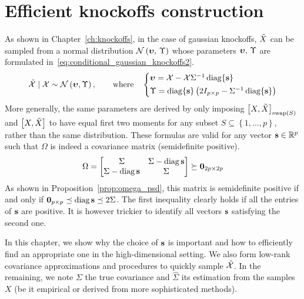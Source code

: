 \chapter{Efficient knockoffs construction}\label{ch:sdp}

As shown in Chapter~\ref{ch:knockoffs}, in the case of gaussian knockoffs,
$\tilde{X}$ can be sampled from a normal distribution $\mathcal{N}\left( \bm{\upsilon},\, \Upsilon \right)$ whose parameters
$\bm{\upsilon},\, \Upsilon$ are formulated in~\ref{eq:conditional_gaussian_knockoffs2}.
\begin{equation}\label{eq:conditional_gaussian_knockoffs2}
    \tcX \mid \cX \sim \cN\left( \bupsilon, \Upsilon \right)
    ,\qquad\text{where}\quad
    \begin{cases*}
        \bupsilon = \cX - \cX\Sigma^{-1}\diag\{ \bs \}\\
        \Upsilon = \diag\{ \bs \}\left( 2I_{p \times p} - \Sigma^{-1}\diag\{ \bs \} \right)
    \end{cases*}
\end{equation}
More generally, the same parameters are derived by only imposing
$\big[ X, \tilde{X} \big]_{\operatorname{swap}\left( S \right)}$ and $\big[ X, \tilde{X} \big]$
to have equal first two moments
for any subset
$S \subseteq \left\{ 1, \dots, p \right\}$,
rather than the same distribution.
These formulas are valid for any vector $\mathbf{s} \in \mathbb{R}^p$ such that $\Omega$
is indeed a covariance matrix (semidefinite positive).
\begin{equation*}
    \Omega = \begin{bmatrix}
        \Sigma & \Sigma - \operatorname*{diag} \mathbf{s}\\
        \Sigma - \operatorname*{diag} \mathbf{s} & \Sigma
    \end{bmatrix}
    \succeq \mathbf{0}_{2p \times 2p}
\end{equation*}
As shown in Proposition~\ref{prop:omega_psd},
this matrix is semidefinite positive if and only if $\mathbf{0}_{p \times p} \preceq \operatorname*{diag} \mathbf{s} \preceq 2 \Sigma$.
The first inequality clearly holds if all the entries of $\mathbf{s}$ are positive.
It is however trickier to identify all vectors $\mathbf{s}$ satisfying the second one.

In this chapter, we show why the choice of $\mathbf{s}$ is important and how to efficiently find an appropriate one
in the high-dimensional setting.
We also form low-rank covariance approximations and procedures to quickly sample $\tilde{\mathcal{X}}$.
In the remaining, we note $\Sigma$ the true covariance and $\hat{\Sigma}$ its estimation from the samples $X$
(be it empirical or derived from more sophisticated methods).

